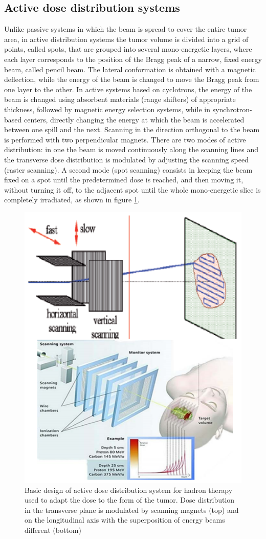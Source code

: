 \subsection{Active dose distribution systems}
\noindent Unlike passive systems in which the beam is spread to cover the entire tumor area, in active distribution systems the tumor volume is divided into a grid of points, called spots, that are grouped into several mono-energetic layers, where each layer corresponds to the position of the Bragg peak of a narrow, fixed energy beam, called pencil beam.
The lateral conformation is obtained with a magnetic deflection, while the energy of the beam is changed to move the Bragg peak from one layer to the other.
In active systems based on cyclotrons, the energy of the beam is changed using absorbent materials (range shifters) of appropriate thickness, followed by magnetic energy selection systems, while in synchrotron-based centers, directly changing the energy at which the beam is accelerated between one spill and the next.
Scanning in the direction orthogonal to the beam is performed with two perpendicular magnets.
\newline
There are two modes of active distribution: in one the beam is moved continuously along the scanning lines and the transverse dose distribution is modulated by adjusting the scanning speed (raster scanning). A second mode (spot scanning)\cite{cnao} consists in keeping the beam fixed on a spot until the predetermined dose is reached, and then moving it, without turning it off, to the adjacent spot until the whole mono-energetic slice is completely irradiated, as shown in figure \ref{fig:active}.
\begin{figure}[H]
	\centering
	\includegraphics[width=0.7\linewidth]{IMG/ch1/Active}
	\caption{Basic design of active dose distribution system for hadron therapy used to adapt the dose to the form of the tumor. Dose distribution in the transverse plane is modulated by scanning magnets (top) and on the longitudinal axis with the superposition of energy beams different (bottom)}
	\label{fig:active}
\end{figure}
